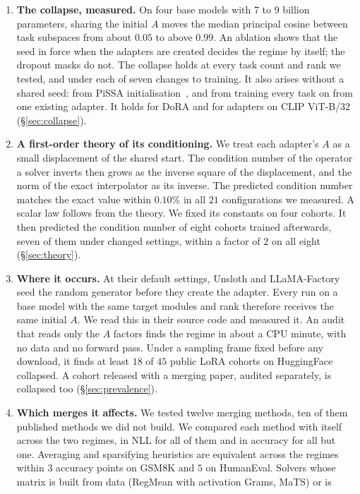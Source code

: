 \begin{enumerate}[leftmargin=*,itemsep=2pt,topsep=3pt]
\item \textbf{The collapse, measured.} On four base models with 7 to 9 billion
parameters, sharing the initial $A$ moves the median principal cosine between
task subspaces from about $0.05$ to above $0.99$. An ablation shows
that the seed in force when the adapters are created decides the regime by
itself; the dropout masks do not. The collapse holds at every task count and
rank we tested, and under each of seven changes to training. It also arises
without a shared seed: from PiSSA initialisation~\citep{meng2024pissa}, and
from training every task on from one existing adapter. It holds for DoRA and
for adapters on CLIP ViT-B/32 (\S\ref{sec:collapse}).
\item \textbf{A first-order theory of its conditioning.} We treat each
adapter's $A$ as a small displacement of the shared start. The condition
number of the operator a solver inverts then grows as the inverse square of
the displacement, and the norm of the exact interpolator as its inverse. The
predicted condition number matches the exact value within $0.10\%$ in all $21$
configurations we measured. A scalar law follows from the theory. We fixed its
constants on four cohorts. It then predicted the condition number of eight
cohorts trained afterwards, seven of them under changed settings, within a
factor of $2$ on all eight (\S\ref{sec:theory}).
\item \textbf{Where it occurs.} At their default settings, Unsloth and
LLaMA-Factory seed the random generator before they create the adapter. Every
run on a base model with the same target modules and rank therefore receives
the same initial $A$. We read this in their source code and measured it. An
audit that reads only the $A$ factors finds the regime in about a CPU minute,
with no data and no forward pass. Under a sampling frame fixed before any
download, it finds at least $18$ of $45$ public LoRA cohorts on HuggingFace
collapsed. A cohort released with a merging paper, audited separately, is
collapsed too (\S\ref{sec:prevalence}).
\item \textbf{Which merges it affects.} We tested twelve merging methods, ten
of them published methods we did not build. We compared each method with
itself across the two regimes, in NLL for all of them and in accuracy for all
but one. Averaging and sparsifying heuristics are equivalent across the
regimes within $3$ accuracy points on GSM8K and $5$ on HumanEval. Solvers
whose matrix is built from data (RegMean with activation Grams, MaTS) or is

\end{enumerate}
